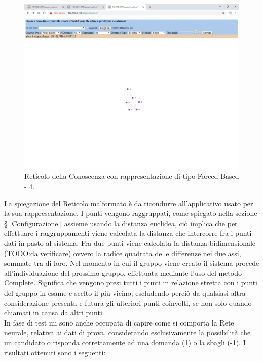 \noindent
\begin{figure}[H]
\centering
	\includegraphics[width=1\linewidth]{./image/reticoloNonCorretto8.png}
	\caption{Reticolo della Conoscenza con rappresentazione di tipo Forced Based - 4.}
	\label{Reticolo della Conoscenza con rappresentazione di tipo Forced Based - 4.}
\end{figure}
\noindent
La spiegazione del Reticolo malformato \`e da ricondurre all'applicativo usato per la sua rappresentazione. I punti vengono raggruppati, come spiegato nella sezione § \ref{Configurazione.} assieme usando la distanza euclidea, ci\`o implica che per effettuare i raggruppamenti viene calcolata la distanza che intercorre fra i punti dati in pasto al sistema. Fra due punti viene calcolata la distanza bidimensionale (TODO:da verificare) ovvero la radice quadrata delle differenze  nei due assi, sommate tra di loro. Nel momento in cui il gruppo viene creato il sistema procede all'individuazione del prossimo gruppo, effettuata mediante l'uso del metodo Complete. Significa che vengono presi tutti i punti in relazione stretta con i punti del gruppo in esame e scelto il pi\`u vicino; escludendo perci\`o da qualsiasi altra considerazione presenta e futura gli ulteriori punti coinvolti, se non solo quando chiamati in causa da altri punti.\\
\noindent
In fase di test mi sono anche occupata di capire come si comporta la Rete neurale, relativa ai dati di prova, considerando esclusivamente la possibilit\`a che un candidato o risponda correttamente ad una domanda (1) o la sbagli (-1). I risultati ottenuti sono i seguenti:
